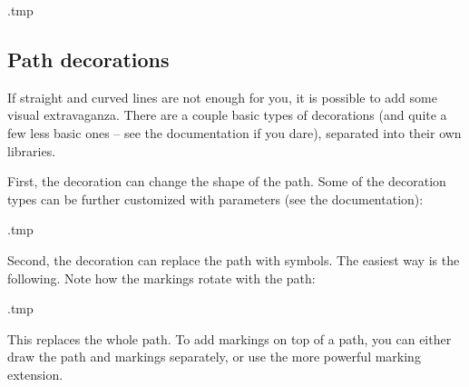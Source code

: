 \begin{VerbatimOut}{\jobname.tmp}
\centering

\end{VerbatimOut}
\ShowExampleBelow[2]


%
\subsection{Path decorations}

If straight and curved lines are not enough for you,
it is possible to add some visual extravaganza.
There are a couple basic types of decorations
(and quite a few less basic ones -- see the documentation if you dare),
separated into their own libraries.

First, the decoration can change the shape of the path.
Some of the decoration types can be further customized with parameters (see the documentation):
%
\begin{VerbatimOut}{\jobname.tmp}
\centering

\end{VerbatimOut}
\ShowExampleBelow[2]

Second, the decoration can replace the path with symbols.
The easiest way is the following.
Note how the markings rotate with the path:
%
\begin{VerbatimOut}{\jobname.tmp}
\centering

\end{VerbatimOut}
\ShowExampleBelow[2]
%
This replaces the whole path.
To add markings on top of a path, you can either draw the path and markings separately,
or use the more powerful marking extension.

